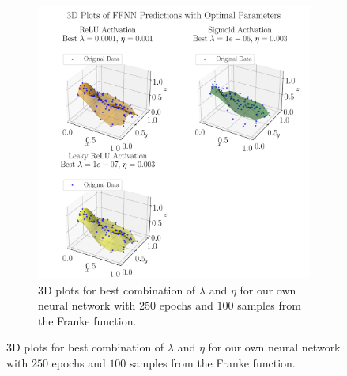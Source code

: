 \documentclass[%
reprint,s
amsmath,amssymb,
aps,
]{revtex4-2}
\begin{document}
\begin{figure}[ht!]
\begin{subfigure}[b]{0.49\textwidth}
		\includegraphics[width=\textwidth]{Python/Figures/NN_noKeras_3D_Franke_Epochs250.pdf}
		\caption{3D plots for best combination of $\lambda$ and $\eta$ for our own neural network with $250$ epochs and $100$ samples from the Franke function.}
		\label{fig:NN_noKeras_3D_Franke_Epochs250}
	\end{subfigure}
\end{figure}

	
\end{document}
